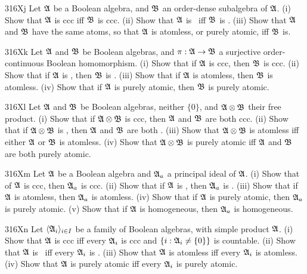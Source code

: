 {\spheader 316Xj Let $\frak A$ be a Boolean algebra, and $\frak B$ an
order-dense subalgebra of $\frak A$.
(i) Show that $\frak A$ is ccc iff $\frak B$ is ccc.
(ii) Show that $\frak A$ is \wsid\ iff $\frak B$ is \wsid.
(iii) Show that $\frak A$ and
$\frak B$ have the same atoms, so that $\frak A$ is atomless, or purely
atomic, iff $\frak B$ is.

\spheader 316Xk Let $\frak A$ and $\frak B$ be Boolean algebras, and
$\pi:\frak A\to\frak B$ a surjective order-continuous Boolean homomorphism.
(i) Show that if $\frak A$ is ccc, then $\frak B$ is ccc.
(ii) Show that if $\frak A$ is \wsid, then $\frak B$ is \wsid.
(iii) Show that if $\frak A$ is atomless, then $\frak B$ is atomless.
(iv) Show that if $\frak A$ is purely atomic, then $\frak B$ is
purely atomic.

\spheader 316Xl Let $\frak A$ and $\frak B$ be Boolean algebras,
neither $\{0\}$, and
$\frak A\otimes\frak B$ their free product.   (i) Show that if
$\frak A\otimes\frak B$ is ccc, then $\frak A$ and $\frak B$ are both ccc.
(ii) Show that if $\frak A\otimes\frak B$ is \wsid,
then $\frak A$ and $\frak B$ are both \wsid.
(iii) Show that $\frak A\otimes\frak B$ is atomless iff either
$\frak A$ or $\frak B$ is atomless.
(iv) Show that $\frak A\otimes\frak B$ is purely atomic iff $\frak A$ and
$\frak B$ are both purely atomic.

\spheader 316Xm Let $\frak A$ be a Boolean algebra and $\frak A_a$ a
principal ideal of $\frak A$.
(i) Show that of $\frak A$ is ccc, then $\frak A_a$ is ccc.
(ii) Show that if $\frak A$ is \wsid, then $\frak A_a$ is \wsid.
(iii) Show that if $\frak A$ is atomless, then $\frak A_a$ is atomless.
(iv) Show that if $\frak A$ is purely atomic, then $\frak A_a$ is purely
atomic.
(v) Show that if $\frak A$ is homogeneous, then $\frak A_a$ is homogeneous.

\spheader 316Xn
Let $\langle\frak A_i\rangle_{i\in I}$ be a
family of Boolean algebras, with simple product $\frak A$.
(i) Show that $\frak A$ is
ccc iff every $\frak A_i$ is ccc and $\{i:\frak A_i\ne\{0\}\}$ is
countable.
(ii) Show that $\frak A$ is \wsid\ iff every $\frak A_i$ is \wsid.
(iii) Show that $\frak A$ is atomless iff every $\frak A_i$ is atomless.
(iv) Show that $\frak A$
is purely atomic iff every $\frak A_i$ is purely atomic.

}
